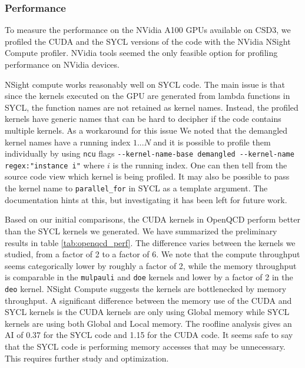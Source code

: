 
\subsubsection{Performance}

To measure the performance on the NVidia A100 GPUs available on CSD3, we profiled the CUDA and the SYCL versions of the code with the NVidia NSight Compute profiler. NVidia tools seemed the only feasible option for profiling performance on NVidia devices.

NSight compute works reasonably well on SYCL code. The main issue is that since the kernels executed on the GPU are generated from lambda functions in SYCL, the function names are not retained as kernel names. Instead, the profiled kernels have generic names that can be hard to decipher if the code contains multiple kernels. As a workaround for this issue We noted that the demangled kernel names have a running index $1 ... N$ and it is possible to profile them individually by using \verb #ncu# flags \verb #--kernel-name-base demangled --kernel-name regex:"instance i"# where $i$ is the running index. One can then tell from the source code view which kernel is being profiled. It may also be possible to pass the kernel name to \verb #parallel_for# in SYCL as a template argument. The documentation hints at this, but investigating it has been left for future work.

Based on our initial comparisons, the CUDA kernels in OpenQCD perform better than the SYCL kernels we generated. We have summarized the preliminary results in table \ref{tab:openqcd_perf}. The difference varies between the kernels we studied, from a factor of 2 to a factor of 6. We note that the compute throughput seems categorically lower by roughly a factor of 2, while the memory throughput is comparable in the \verb #mulpauli# and \verb #doe# kernels and lower by a factor of 2 in the \verb #deo# kernel. NSight Compute suggests the kernels are bottlenecked by memory throughput. A significant difference between the memory use of the CUDA and SYCL kernels is the CUDA kernels are only using Global memory while SYCL kernels are using both Global and Local memory. The roofline analysis gives an AI of 0.37 for the SYCL code and 1.15 for the CUDA code. It seems safe to say that the SYCL code is performing memory accesses that may be unnecessary. This requires further study and optimization.

